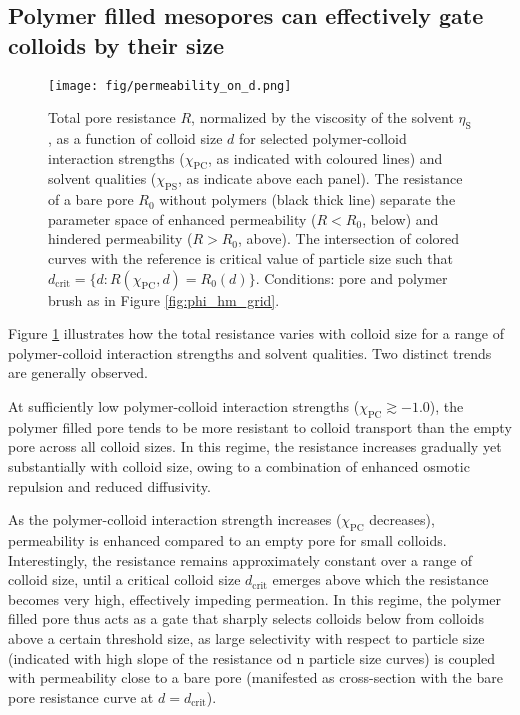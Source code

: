 \documentclass[12pt, a4paper]{article}
\begin{document}
\subsection{Polymer filled mesopores can effectively gate colloids by their size}

\begin{figure}
    \centering
    \texttt{[image: fig/permeability\_on\_d.png]}
    \caption{
    Total pore resistance $R$, normalized by the viscosity of the solvent $\eta_\text{S}$, as a function of colloid size $d$ for selected polymer-colloid interaction strengths ($\chi_{\text{PC}}$, as indicated with coloured lines) and solvent qualities ($\chi_{\text{PS}}$, as indicate above each panel). 
    The resistance of a bare pore $R_{0}$ without polymers (black thick line) separate the parameter space of enhanced permeability ($R < R_{0}$, below) and hindered permeability ($R > R_{0}$, above).
    The intersection of colored curves with the reference is critical value of particle size such that  $d_{\text{crit}} = \{d: R(\chi_{\text{PC}}, d) = R_{0}(d)\}$.
    Conditions: pore and polymer brush as in Figure \ref{fig:phi_hm_grid}. 
    }
    \label{fig:R_vs_d}
\end{figure}

Figure \ref{fig:R_vs_d} illustrates how the total resistance varies with colloid size for a range of polymer-colloid interaction strengths and solvent qualities. 
Two distinct trends are generally observed.

At sufficiently low polymer-colloid interaction strengths ($\chi_{\text{PC}} \gtrsim -1.0$), the polymer filled pore tends to be more resistant to colloid transport than the empty pore across all colloid sizes.
In this regime, the resistance increases gradually yet substantially with colloid size, owing to a combination of enhanced osmotic repulsion and reduced diffusivity.

As the polymer-colloid interaction strength increases ($\chi_{\text{PC}}$ decreases), permeability is enhanced compared to an empty pore for small colloids. 
Interestingly, the resistance remains approximately constant over a range of colloid size, until a critical colloid size $d_{\text{crit}}$ emerges above which the resistance becomes very high, effectively impeding permeation. 
In this regime, the polymer filled pore thus acts as a gate that sharply selects colloids below from colloids above a certain threshold size, as large selectivity with respect to particle size (indicated with high slope of the resistance od n particle size curves) is coupled with permeability close to a bare pore (manifested as cross-section with the bare pore resistance curve at $d = d_{\text{crit}}$).
\end{document}

